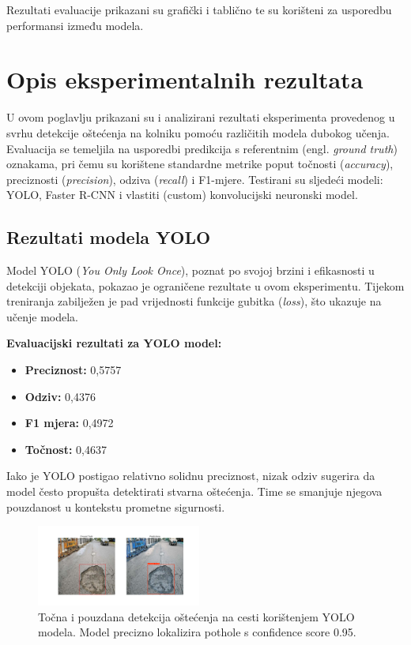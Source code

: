 \documentclass[conference]{IEEEtran}
\begin{document}
Rezultati evaluacije prikazani su grafički i tablično te su korišteni za usporedbu performansi između modela.


\section{Opis eksperimentalnih rezultata}

U ovom poglavlju prikazani su i analizirani rezultati eksperimenta provedenog u svrhu detekcije oštećenja na kolniku pomoću različitih modela dubokog učenja. Evaluacija se temeljila na usporedbi predikcija s referentnim (engl. \textit{ground truth}) oznakama, pri čemu su korištene standardne metrike poput točnosti (\textit{accuracy}), preciznosti (\textit{precision}), odziva (\textit{recall}) i F1-mjere. Testirani su sljedeći modeli: YOLO, Faster R-CNN i vlastiti (custom) konvolucijski neuronski model.

\subsection{Rezultati modela YOLO}

Model YOLO (\textit{You Only Look Once}), poznat po svojoj brzini i efikasnosti u detekciji objekata, pokazao je ograničene rezultate u ovom eksperimentu. Tijekom treniranja zabilježen je pad vrijednosti funkcije gubitka (\textit{loss}), što ukazuje na učenje modela.

\textbf{Evaluacijski rezultati za YOLO model:}
\begin{itemize}
  \item \textbf{Preciznost:} 0{,}5757
  \item \textbf{Odziv:} 0{,}4376
  \item \textbf{F1 mjera:} 0{,}4972
  \item \textbf{Točnost:} 0{,}4637
\end{itemize}

Iako je YOLO postigao relativno solidnu preciznost, nizak odziv sugerira da model često propušta detektirati stvarna oštećenja. Time se smanjuje njegova pouzdanost u kontekstu prometne sigurnosti.

\begin{figure}[htbp]
\centerline{\includegraphics[width=0.48\textwidth]{Images/YOLOPic.png}}
\caption{Točna i pouzdana detekcija oštećenja na cesti korištenjem YOLO modela. Model precizno lokalizira pothole s confidence score 0.95.}
\label{fig:yolo_eval}
\end{figure}
\end{document}
